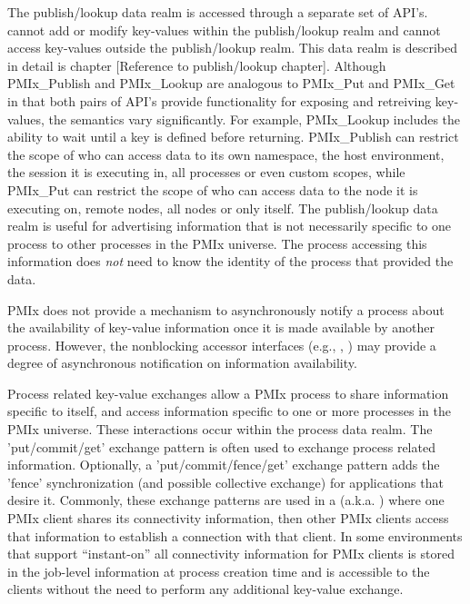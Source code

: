 The publish/lookup data realm is accessed through a separate set of API's.
 cannot add or modify key-values within the publish/lookup realm and 
 cannot access key-values outside the publish/lookup realm.
This data realm is described in detail is chapter [Reference to publish/lookup chapter].
Although PMIx_Publish and PMIx_Lookup are analogous to PMIx_Put and PMIx_Get in that both pairs 
of API's provide functionality for exposing and retreiving key-values, the semantics vary significantly.  
For example, PMIx_Lookup includes the ability to wait until a key is defined before returning.
PMIx_Publish can restrict the scope of who can access data to its own namespace, the host environment, the session it is executing in, all processes or even custom scopes, while  
PMIx_Put can restrict the scope of who can access data to the node it is executing on, remote nodes, 
all nodes or only itself.
The publish/lookup data realm is useful for advertising information that is not necessarily specific to one process to other processes in the \ac{PMIx} universe.
The process accessing this information does \emph{not} need to know the identity of the process that provided the data.

\ac{PMIx} does not provide a mechanism to asynchronously notify a process about the availability of key-value information once it is made available by another process.
However, the nonblocking accessor interfaces (e.g., , ) may provide a degree of asynchronous notification on information availability.

Process related key-value exchanges allow a \ac{PMIx} process to share information specific to 
itself, and access information specific to one or more processes in the \ac{PMIx} universe.
These interactions occur within the process data realm.
The 'put/commit/get' exchange pattern is often used to exchange process related information.
Optionally, a 'put/commit/fence/get' exchange pattern adds the 'fence' synchronization 
(and possible collective exchange) for applications that desire it.
Commonly, these exchange patterns are used in a 
 (a.k.a. ) 
where one \ac{PMIx} client shares its connectivity information, then other \ac{PMIx} clients access that information to establish a connection with that client.
In some environments that support ``instant-on'' all connectivity information for \ac{PMIx} clients is stored in the job-level information at process creation time and is accessible to the clients without the need to perform any additional key-value exchange.

